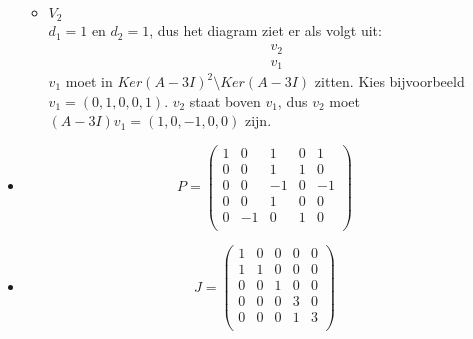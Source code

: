 \documentclass[main.tex]{subfiles}
\begin{document}
\begin{itemize}
\begin{itemize}
  \item $V_{2}$\\
    $d_{1} = 1$ en $d_{2} = 1$, dus het diagram ziet er als volgt uit:
    \[
    \begin{array}{c}
      \boxed{v_{2}}\\
      \boxed{v_{1}}
    \end{array}
    \]
    $v_{1}$ moet in $Ker(A-3I)^{2}\setminus Ker(A-3I)$ zitten.
    Kies bijvoorbeeld $v_{1}= (0,1,0,0,1)$.
    $v_{2}$ staat boven $v_{1}$, dus $v_{2}$ moet $(A-3I)v_{1}= (1,0,-1,0,0)$ zijn.

  \end{itemize}
\item 
  \[ P = 
  \left(
    \begin{array}{ccc|cc}
      1 & 0 & 1 & 0 & 1\\
      0 & 0 & 1 & 1 & 0\\
      0 & 0 & -1& 0 &-1\\
      0 & 0 & 1 & 0 & 0\\
      0 & -1& 0 & 1 & 0\\
    \end{array}
  \right)
  \]
\item 
  \[ J =
  \left(
    \begin{array}{ccc|cc}
      1 & 0 & 0 & 0 & 0\\
      1 & 1 & 0 & 0 & 0\\
      0 & 0 & 1 & 0 & 0\\\hline
      0 & 0 & 0 & 3 & 0\\
      0 & 0 & 0 & 1 & 3\\
    \end{array}
  \right)
  \]
\end{itemize}
\end{document}

